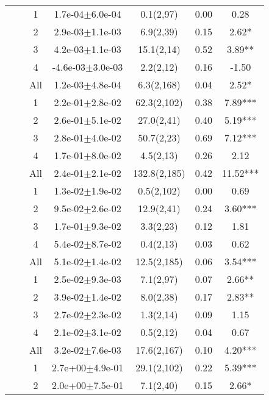 \begin{longtable}{llccccS[table-format=-2.2, table-space-text-post = {***}]}
{} & {} & 1 &  1.7e-04$\pm$6.0e-04 & 0.1(2,97) & 0.00 & 0.28 \\ 
   &  & 2 &  2.9e-03$\pm$1.1e-03 & 6.9(2,39) & 0.15 & 2.62* \\ 
   &  & 3 &  4.2e-03$\pm$1.1e-03 & 15.1(2,14) & 0.52 & 3.89** \\ 
   &  & 4 & -4.6e-03$\pm$3.0e-03 & 2.2(2,12) & 0.16 & -1.50 \\ 
   &  & All &  1.2e-03$\pm$4.8e-04 & 6.3(2,168) & 0.04 & 2.52* \\ 
   \midrule
{} & {} & 1 &  2.2e-01$\pm$2.8e-02 & 62.3(2,102) & 0.38 & 7.89*** \\ 
   &  & 2 &  2.6e-01$\pm$5.1e-02 & 27.0(2,41) & 0.40 & 5.19*** \\ 
   &  & 3 &  2.8e-01$\pm$4.0e-02 & 50.7(2,23) & 0.69 & 7.12*** \\ 
   &  & 4 &  1.7e-01$\pm$8.0e-02 & 4.5(2,13) & 0.26 & 2.12 \\ 
   &  & All &  2.4e-01$\pm$2.1e-02 & 132.8(2,185) & 0.42 & 11.52*** \\ 
   \midrule
{} & {} & 1 &  1.3e-02$\pm$1.9e-02 & 0.5(2,102) & 0.00 & 0.69 \\ 
   &  & 2 &  9.5e-02$\pm$2.6e-02 & 12.9(2,41) & 0.24 & 3.60*** \\ 
   &  & 3 &  1.7e-01$\pm$9.3e-02 & 3.3(2,23) & 0.12 & 1.81 \\ 
   &  & 4 &  5.4e-02$\pm$8.7e-02 & 0.4(2,13) & 0.03 & 0.62 \\ 
   &  & All &  5.1e-02$\pm$1.4e-02 & 12.5(2,185) & 0.06 & 3.54*** \\ 
   \midrule
{} & {} & 1 &  2.5e-02$\pm$9.3e-03 & 7.1(2,97) & 0.07 & 2.66** \\ 
   &  & 2 &  3.9e-02$\pm$1.4e-02 & 8.0(2,38) & 0.17 & 2.83** \\ 
   &  & 3 &  2.7e-02$\pm$2.3e-02 & 1.3(2,14) & 0.09 & 1.15 \\ 
   &  & 4 &  2.1e-02$\pm$3.1e-02 & 0.5(2,12) & 0.04 & 0.67 \\ 
   &  & All &  3.2e-02$\pm$7.6e-03 & 17.6(2,167) & 0.10 & 4.20*** \\ 
   \midrule
{} & {} & 1 &  2.7e+00$\pm$4.9e-01 & 29.1(2,102) & 0.22 & 5.39*** \\ 
   &  & 2 &  2.0e+00$\pm$7.5e-01 & 7.1(2,40) & 0.15 & 2.66* \\ 

\end{longtable}
